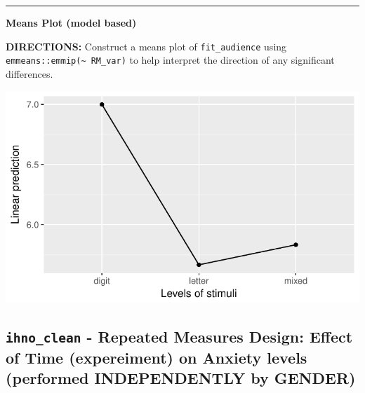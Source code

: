 \documentclass[]{article}
\newenvironment{Shaded}{\begin{snugshade}}{\end{snugshade}}
\newcommand{\KeywordTok}[1]{\textcolor[rgb]{0.13,0.29,0.53}{\textbf{#1}}}
\newcommand{\DataTypeTok}[1]{\textcolor[rgb]{0.13,0.29,0.53}{#1}}
\newcommand{\DecValTok}[1]{\textcolor[rgb]{0.00,0.00,0.81}{#1}}
\newcommand{\StringTok}[1]{\textcolor[rgb]{0.31,0.60,0.02}{#1}}
\newcommand{\CommentTok}[1]{\textcolor[rgb]{0.56,0.35,0.01}{\textit{#1}}}
\newcommand{\OperatorTok}[1]{\textcolor[rgb]{0.81,0.36,0.00}{\textbf{#1}}}
\newcommand{\NormalTok}[1]{#1}
\begin{document}
\begin{center}\rule{0.5\linewidth}{\linethickness}\end{center}

\textbf{Means Plot (model based)}

\textbf{DIRECTIONS:} Construct a means plot of \texttt{fit\_audience}
using \texttt{emmeans::emmip(\textasciitilde{}\ RM\_var)} to help
interpret the direction of any significant differences.

\begin{Shaded}
\end{Shaded}

\begin{center}\includegraphics{Unit_5_assignment_KEY_R__spr18__files/figure-latex/unnamed-chunk-28-1} \end{center}

\clearpage

\subsection{\texorpdfstring{\texttt{ihno\_clean} - Repeated Measures
Design: Effect of Time (expereiment) on Anxiety levels (performed
INDEPENDENTLY by
GENDER)}{ihno\_clean - Repeated Measures Design: Effect of Time (expereiment) on Anxiety levels (performed INDEPENDENTLY by GENDER)}}\label{ihno_clean---repeated-measures-design-effect-of-time-expereiment-on-anxiety-levels-performed-independently-by-gender}
\end{document}
